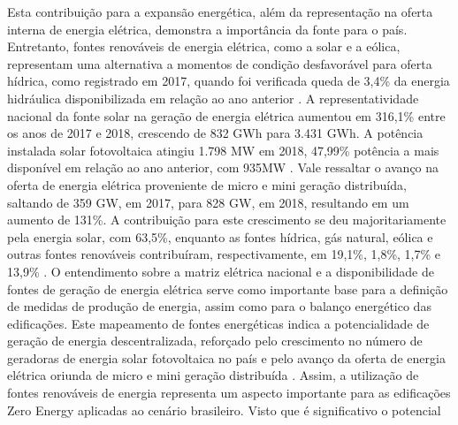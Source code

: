 \begin{onehalfspace}
    \noindent Esta contribuição para a expansão energética, além da representação na oferta interna de 
    energia elétrica, demonstra a importância da fonte para o país. Entretanto, fontes renováveis 
    de energia elétrica, como a solar e a eólica, representam uma alternativa a momentos de 
    condição desfavorável para oferta hídrica, como registrado em 2017, quando foi verificada 
    queda de 3,4\% da energia hidráulica disponibilizada em relação ao ano anterior \cite{EmpresadePesquisaEnergetica-EPE2018}.\vspace{0.3cm} \newline
    A representatividade nacional da fonte solar na geração de energia elétrica aumentou em 316,1\% 
    entre os anos de 2017 e 2018, crescendo de 832 GWh para 3.431 GWh. A potência instalada solar 
    fotovoltaica atingiu 1.798 MW em 2018, 47,99\% potência a mais disponível em relação ao ano 
    anterior, com 935MW \cite{EmpresadePesquisaEnergetica-EPE2019,EmpresadePesquisaEnergetica-EPE2019a}.\vspace{0.3cm} \newline
    Vale ressaltar o avanço na oferta de energia elétrica proveniente de micro e mini geração 
    distribuída, saltando de 359 GW, em 2017, para 828 GW, em 2018, resultando em um aumento de 131\%. 
    A contribuição para este crescimento se deu majoritariamente pela energia solar, com 63,5\%, 
    enquanto as fontes hídrica, gás natural, eólica e outras fontes renováveis contribuíram, respectivamente, 
    em 19,1\%, 1,8\%, 1,7\% e 13,9\% \cite{EmpresadePesquisaEnergetica-EPE2019}.\vspace{0.3cm} \newline
    O entendimento sobre a matriz elétrica nacional e a disponibilidade de fontes de geração de 
    energia elétrica serve como importante base para a definição de medidas de produção de energia, 
    assim como para o balanço energético das edificações. Este mapeamento de fontes energéticas 
    indica a potencialidade de geração de energia descentralizada, reforçado pelo crescimento 
    no número de geradoras de energia solar fotovoltaica no país e pelo avanço da oferta de energia 
    elétrica oriunda de micro e mini geração distribuída \cite{EmpresadePesquisaEnergetica-EPE2019,EmpresadePesquisaEnergetica-EPE2019a,Pereira2017}.\vspace{0.3cm} \newline
    Assim, a utilização de fontes renováveis de energia representa um aspecto importante para as 
    edificações Zero Energy aplicadas ao cenário brasileiro. Visto que é significativo o potencial 

\end{onehalfspace}
